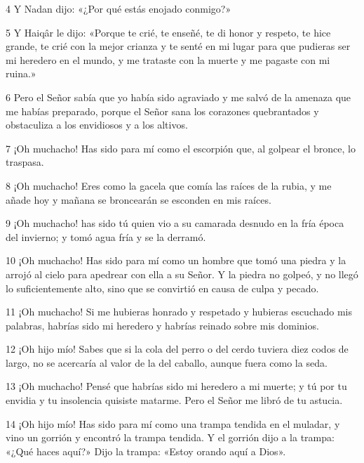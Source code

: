 \par 4 Y Nadan dijo: «¿Por qué estás enojado conmigo?»

\par 5 Y Haiqâr le dijo: «Porque te crié, te enseñé, te di honor y respeto, te hice grande, te crié con la mejor crianza y te senté en mi lugar para que pudieras ser mi heredero en el mundo, y me trataste con la muerte y me pagaste con mi ruina.»

\par 6 Pero el Señor sabía que yo había sido agraviado y me salvó de la amenaza que me habías preparado, porque el Señor sana los corazones quebrantados y obstaculiza a los envidiosos y a los altivos.

\par 7 ¡Oh muchacho! Has sido para mí como el escorpión que, al golpear el bronce, lo traspasa.

\par 8 ¡Oh muchacho! Eres como la gacela que comía las raíces de la rubia, y me añade hoy y mañana se broncearán se esconden en mis raíces.

\par 9 ¡Oh muchacho! has sido tú quien vio a su camarada desnudo en la fría época del invierno; y tomó agua fría y se la derramó.

\par 10 ¡Oh muchacho! Has sido para mí como un hombre que tomó una piedra y la arrojó al cielo para apedrear con ella a su Señor. Y la piedra no golpeó, y no llegó lo suficientemente alto, sino que se convirtió en causa de culpa y pecado.

\par 11 ¡Oh muchacho! Si me hubieras honrado y respetado y hubieras escuchado mis palabras, habrías sido mi heredero y habrías reinado sobre mis dominios.

\par 12 ¡Oh hijo mío! Sabes que si la cola del perro o del cerdo tuviera diez codos de largo, no se acercaría al valor de la del caballo, aunque fuera como la seda.

\par 13 ¡Oh muchacho! Pensé que habrías sido mi heredero a mi muerte; y tú por tu envidia y tu insolencia quisiste matarme. Pero el Señor me libró de tu astucia.

\par 14 ¡Oh hijo mío! Has sido para mí como una trampa tendida en el muladar, y vino un gorrión y encontró la trampa tendida. Y el gorrión dijo a la trampa: «¿Qué haces aquí?» Dijo la trampa: «Estoy orando aquí a Dios».

